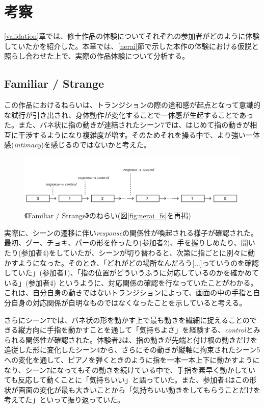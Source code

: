 \chapter{考察}
\label{考察}
\ref{validation}章では、修士作品の体験についてそれぞれの参加者がどのように体験していたかを紹介した。本章では、\ref{nerai}節で示した本作の体験における仮説と照らし合わせた上で、実際の作品体験について分析する。

\section{Familiar / Strange}
この作品におけるねらいは、トランジションの際の違和感が起点となって意識的な試行が引き出され、身体動作が変化することで一体感が生起することであった。また、バネ状に指の動きが連結されたシーン7では、はじめて指の動きが相互に干渉するようになり複雑度が増す。そのためそれを操る中で、より強い一体感(\textit{intimacy})を感じるのではないかと考えた。

\begin{figure}[H]
  \centering
  \includegraphics[width=15cm]{img/nerai_fs.png}
  \caption{《Familiar / Strange》のねらい(図\ref{fig:nerai_fs}を再掲)}
  \label{fig:nerai_fs_in_discussion}
\end{figure}

実際に、シーンの遷移に伴い\textit{response}の関係性が喚起される様子が確認された。
最初、グー、チョキ、パーの形を作ったり(参加者2)、手を握りしめたり、開いたり(参加者4)をしていたが、シーンが切り替わると、次第に指ごとに別々に動かすようになった。そのとき、「どれがどの場所なんだろう[...]っていうのを確認していた」(参加者1)、「指の位置がどういうふうに対応しているのかを確かめている」(参加者4)
というように、対応関係の確認を行なっていたことがわかる。これは、自分自身の動きではないトランジションによって、画面の中の手指と自分自身の対応関係が自明なものではなくなったことを示していると考える。

さらにシーン7では、バネ状の形を動かす上で最も動きを繊細に捉えることのできる縦方向に手指を動かすことを通して「気持ちよさ」を経験する、\textit{control}とみられる関係性が確認された。体験者2は、指の動きが先端と付け根の動きだけを追従した形に変化したシーン4から、さらにその動きが縦軸に拘束されたシーン5への変化を通して、ピアノを弾くときのように指を一本一本上下に動かすようになり、シーン7になってもその動きを続けている中で、手指を素早く動かしていても反応して動くことに「気持ちいい」と語っていた。また、参加者4はこの形状が画面の変化が最も大きいことから「気持ちいい動きをしてもらうことだけを考えてた」といって振り返っていた。

